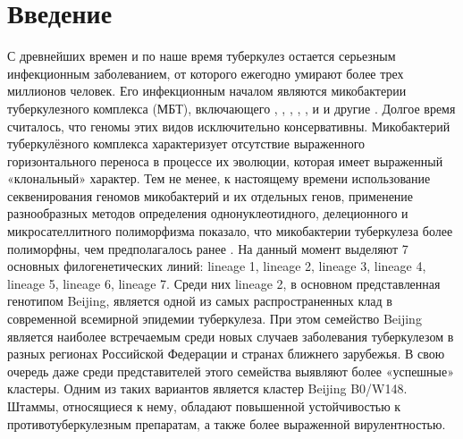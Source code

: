 \section{Введение}
С древнейших времен и по наше время туберкулез остается серьезным инфекционным заболеванием, от которого ежегодно умирают более трех миллионов человек. Его инфекционным началом являются микобактерии туберкулезного комплекса (МБТ), включающего , , , , ,  и  и другие \cite{brosch2002new}. Долгое время считалось, что геномы этих видов исключительно консервативны. Микобактерий туберкулёзного комплекса характеризует отсутствие выраженного горизонтального переноса в процессе их эволюции, которая имеет выраженный «клональный» характер. Тем не менее, к настоящему времени использование секвенирования геномов микобактерий и их отдельных генов, применение разнообразных методов определения однонуклеотидного, делеционного и микросателлитного полиморфизма показало, что микобактерии туберкулеза более полиморфны, чем предполагалось ранее \cite{tsolaki2004functional}. На данный момент выделяют 7 основных филогенетических линий: lineage 1, lineage 2, lineage 3, lineage 4, lineage 5, lineage 6, lineage 7. Среди них lineage  2, в основном представленная генотипом Beijing, является одной из самых распространенных клад в современной всемирной эпидемии туберкулеза. При этом семейство Beijing является наиболее встречаемым среди новых случаев заболевания туберкулезом в разных регионах Российской Федерации и странах ближнего зарубежья. В свою очередь даже среди представителей этого семейства выявляют более «успешные» кластеры. Одним из таких вариантов является кластер Beijing B0/W148. Штаммы, относящиеся к нему, обладают повышенной устойчивостью к противотуберкулезным препаратам, а также более выраженной вирулентностью.
